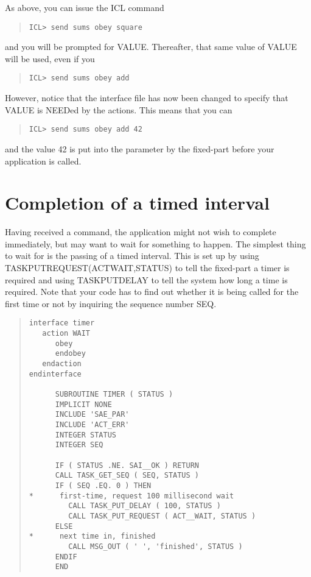 \documentclass[twoside,11pt]{article}
\newcommand{\xlabel}[1]{}
\renewcommand{\_}{\texttt{\symbol{95}}}
\begin{document}
As above, you can issue the ICL command

\small \begin{quote} \begin{verbatim}
ICL> send sums obey square
\end{verbatim} \end{quote} \normalsize

and you will be prompted for VALUE. Thereafter, that same value of VALUE 
will be used, even if you

\small \begin{quote} \begin{verbatim}
ICL> send sums obey add
\end{verbatim} \end{quote} \normalsize

However, notice that the interface file has now been changed to specify that 
VALUE is NEEDed by the actions. This means that you can

\small \begin{quote} \begin{verbatim}
ICL> send sums obey add 42
\end{verbatim} \end{quote} \normalsize

and the value 42 is put into the parameter by the fixed-part before your 
application is called.

\section{Completion of a timed interval\xlabel{completion_of_a_timed_interval}}

Having received a command, the application might not wish to complete
immediately, but may want to wait for something to happen. The simplest
thing to wait for is the passing of a timed interval. This is set up by
using TASK\_PUT\_REQUEST(ACT\_\_WAIT,STATUS) to tell the fixed-part a
timer is required and using TASK\_PUT\_DELAY to tell the system how long
a time is required. Note that your code has to find out whether it is
being called for the first time or not by inquiring the sequence number
SEQ. 

\small \begin{quote} \begin{verbatim}
interface timer
   action WAIT
      obey
      endobey
   endaction
endinterface

      SUBROUTINE TIMER ( STATUS )
      IMPLICIT NONE
      INCLUDE 'SAE_PAR'
      INCLUDE 'ACT_ERR'
      INTEGER STATUS
      INTEGER SEQ

      IF ( STATUS .NE. SAI__OK ) RETURN
      CALL TASK_GET_SEQ ( SEQ, STATUS )
      IF ( SEQ .EQ. 0 ) THEN
*      first-time, request 100 millisecond wait
         CALL TASK_PUT_DELAY ( 100, STATUS )
         CALL TASK_PUT_REQUEST ( ACT__WAIT, STATUS )
      ELSE
*      next time in, finished
         CALL MSG_OUT ( ' ', 'finished', STATUS )
      ENDIF
      END
\end{verbatim} \end{quote} \normalsize
\end{document}
